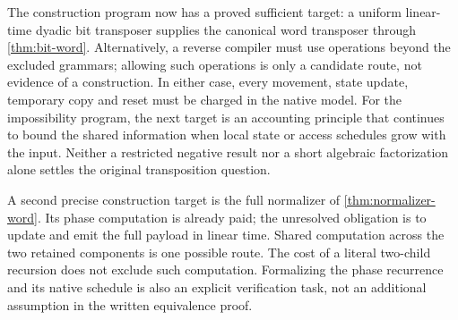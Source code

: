 The construction program now has a proved sufficient target: a uniform
linear-time dyadic bit transposer supplies the canonical word transposer
through \cref{thm:bit-word}. Alternatively, a reverse compiler must use
operations beyond the excluded grammars; allowing such operations is only
a candidate route, not evidence of a construction. In either case, every
movement, state update, temporary copy and reset must be charged in the
native model. For the impossibility program, the next target is an accounting
principle that continues to bound the shared information when local state
or access schedules grow with the input. Neither a
restricted negative result nor a short algebraic factorization alone settles
the original transposition question.

A second precise construction target is the full normalizer of
\cref{thm:normalizer-word}. Its phase computation is already paid; the
unresolved obligation is to update and emit the full payload in linear
time. Shared computation across the two retained components is one
possible route. The cost of a literal two-child recursion does not
exclude such computation. Formalizing the phase recurrence and its
native schedule is also an explicit verification task, not an additional
assumption in the written equivalence proof.
